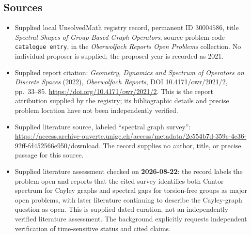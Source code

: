 \documentclass[11pt]{article}
\begin{document}
\subsection{Sources}
\begin{itemize}
\item Supplied local UnsolvedMath registry record, permanent ID \(30004586\), title \emph{Spectral Shapes of Group-Based Graph Operators}, source problem code \texttt{catalogue entry}, in the \emph{Oberwolfach Reports Open Problems} collection. No individual proposer is supplied; the proposed year is recorded as 2021.
\item Supplied report citation: \emph{Geometry, Dynamics and Spectrum of Operators on Discrete Spaces} (2022), \emph{Oberwolfach Reports}, DOI 10.4171/owr/2021/2, pp.\ 33--85. \url{https://doi.org/10.4171/owr/2021/2}. This is the report attribution supplied by the registry; its bibliographic details and precise problem location have not been independently verified.
\item Supplied literature source, labeled ``spectral graph survey'': \url{https://access.archive-ouverte.unige.ch/access/metadata/2e554b7d-359c-4c36-92ff-fd452566e950/download}. The record supplies no author, title, or precise passage for this source.
\item Supplied literature assessment checked on \textbf{2026-08-22}: the record labels the problem open and reports that the cited survey identifies both Cantor spectrum for Cayley graphs and spectral gaps for torsion-free groups as major open problems, with later literature continuing to describe the Cayley-graph question as open. This is supplied dated curation, not an independently verified literature assessment. The background explicitly requests independent verification of time-sensitive status and cited claims.
\end{itemize}
\end{document}
